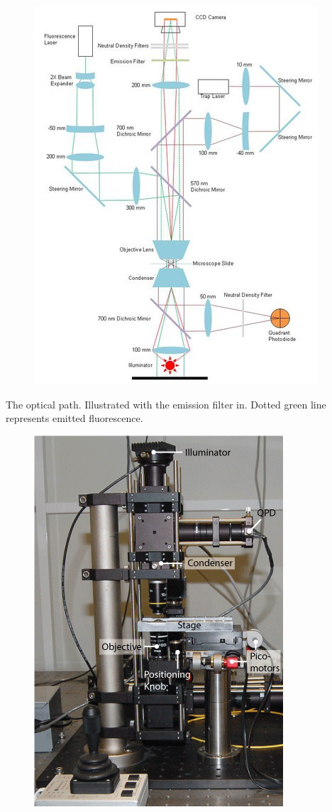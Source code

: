 \documentclass{../lab}
\begin{document}
\begin{figure}[h]
    \centering
    \href{http://experimentationlab.berkeley.edu/sites/default/files/images/400px-Graphic1.jpg}{\includegraphics[width=0.5\linewidth]{images/400px-Graphic1.jpg}}
    \caption{}
    \label{fig:400px-Graphic1}
\end{figure}


The optical path. Illustrated with the emission filter in. Dotted green line represents emitted fluorescence.
\begin{figure}[h]
    \centering
    \href{http://experimentationlab.berkeley.edu/sites/default/files/images/OTZ_From_Front.gif}{\includegraphics[width=0.5\linewidth]{images/OTZ_From_Front.png}}
    \caption{}
    \label{fig:OTZ_From_Front}
\end{figure}
\end{document}
